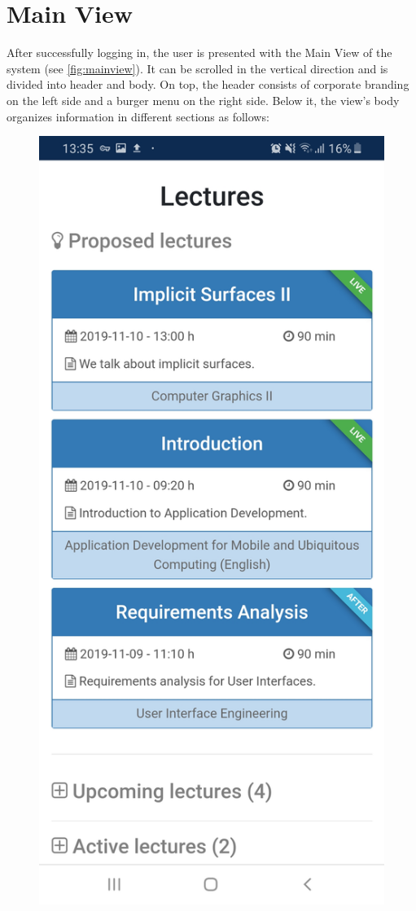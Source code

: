 \section{Main View}
\label{section:soa:mainview}
After successfully logging in, the user is presented with the Main View of the system (see \autoref{fig:mainview}).
It can be scrolled in the vertical direction and is divided into header and body. On top, the header consists of corporate branding on the left side and a burger menu on the right side. Below it, the view's body organizes information in different sections as follows:

\begin{figure}
	\centering
	\begin{minipage}[t]{.5\textwidth}
		\centering
		\includegraphics[width=0.95\linewidth]{screenshots/main_view_1.jpg}

\end{minipage}
\end{figure}
